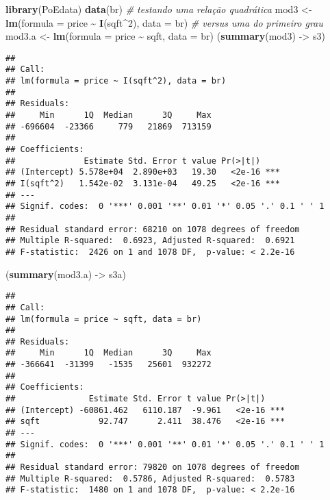 \documentclass[
]{book}
\newenvironment{Shaded}{\begin{snugshade}}{\end{snugshade}}
\newcommand{\AttributeTok}[1]{\textcolor[rgb]{0.13,0.29,0.53}{#1}}
\newcommand{\CommentTok}[1]{\textcolor[rgb]{0.56,0.35,0.01}{\textit{#1}}}
\newcommand{\DecValTok}[1]{\textcolor[rgb]{0.00,0.00,0.81}{#1}}
\newcommand{\FunctionTok}[1]{\textcolor[rgb]{0.13,0.29,0.53}{\textbf{#1}}}
\newcommand{\NormalTok}[1]{#1}
\newcommand{\OtherTok}[1]{\textcolor[rgb]{0.56,0.35,0.01}{#1}}
\newcommand{\SpecialCharTok}[1]{\textcolor[rgb]{0.81,0.36,0.00}{\textbf{#1}}}
\begin{document}
\begin{Shaded}
\begin{Highlighting}[]
\FunctionTok{library}\NormalTok{(PoEdata)}
\FunctionTok{data}\NormalTok{(br)}
\CommentTok{\# testando uma relação quadrática}
\NormalTok{mod3 }\OtherTok{\textless{}{-}} \FunctionTok{lm}\NormalTok{(}\AttributeTok{formula =}\NormalTok{ price }\SpecialCharTok{\textasciitilde{}} \FunctionTok{I}\NormalTok{(sqft}\SpecialCharTok{\^{}}\DecValTok{2}\NormalTok{), }\AttributeTok{data =}\NormalTok{ br)}
\CommentTok{\# versus uma do primeiro grau}
\NormalTok{mod3.a }\OtherTok{\textless{}{-}} \FunctionTok{lm}\NormalTok{(}\AttributeTok{formula =}\NormalTok{ price }\SpecialCharTok{\textasciitilde{}}\NormalTok{ sqft, }\AttributeTok{data =}\NormalTok{ br)}
\NormalTok{(}\FunctionTok{summary}\NormalTok{(mod3) }\OtherTok{{-}\textgreater{}}\NormalTok{ s3)}
\end{Highlighting}
\end{Shaded}

\begin{verbatim}
## 
## Call:
## lm(formula = price ~ I(sqft^2), data = br)
## 
## Residuals:
##     Min      1Q  Median      3Q     Max 
## -696604  -23366     779   21869  713159 
## 
## Coefficients:
##              Estimate Std. Error t value Pr(>|t|)    
## (Intercept) 5.578e+04  2.890e+03   19.30   <2e-16 ***
## I(sqft^2)   1.542e-02  3.131e-04   49.25   <2e-16 ***
## ---
## Signif. codes:  0 '***' 0.001 '**' 0.01 '*' 0.05 '.' 0.1 ' ' 1
## 
## Residual standard error: 68210 on 1078 degrees of freedom
## Multiple R-squared:  0.6923, Adjusted R-squared:  0.6921 
## F-statistic:  2426 on 1 and 1078 DF,  p-value: < 2.2e-16
\end{verbatim}

\begin{Shaded}
\begin{Highlighting}[]
\NormalTok{(}\FunctionTok{summary}\NormalTok{(mod3.a) }\OtherTok{{-}\textgreater{}}\NormalTok{ s3a)}
\end{Highlighting}
\end{Shaded}

\begin{verbatim}
## 
## Call:
## lm(formula = price ~ sqft, data = br)
## 
## Residuals:
##     Min      1Q  Median      3Q     Max 
## -366641  -31399   -1535   25601  932272 
## 
## Coefficients:
##               Estimate Std. Error t value Pr(>|t|)    
## (Intercept) -60861.462   6110.187  -9.961   <2e-16 ***
## sqft            92.747      2.411  38.476   <2e-16 ***
## ---
## Signif. codes:  0 '***' 0.001 '**' 0.01 '*' 0.05 '.' 0.1 ' ' 1
## 
## Residual standard error: 79820 on 1078 degrees of freedom
## Multiple R-squared:  0.5786, Adjusted R-squared:  0.5783 
## F-statistic:  1480 on 1 and 1078 DF,  p-value: < 2.2e-16
\end{verbatim}
\end{document}

